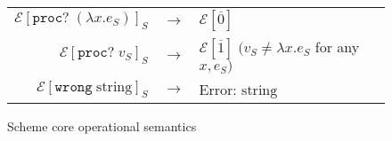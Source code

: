 \begin{figure}
\begin{center}
\begin{tabular}{rcl}
$\mathscr{E}[\mathtt{proc?}\;(\lambda x.e_{S})]_{S}$ & $\rightarrow$ & $\mathscr{E}[\overline{0}]$ \\
$\mathscr{E}[\mathtt{proc?}\;v_{S}]_{S}$ & $\rightarrow$ & $\mathscr{E}[\overline{1}]\;(v_{S}\neq\lambda x.e_{S}$ for any $x,e_{S})$ \\
$\mathscr{E}[\mathtt{wrong}\;\mathrm{string}]_{S}$ & $\rightarrow$ & Error: $\mathrm{string}$
\end{tabular}
\end{center}
\caption{Scheme core operational semantics}
\label{fig:scos}
\end{figure}